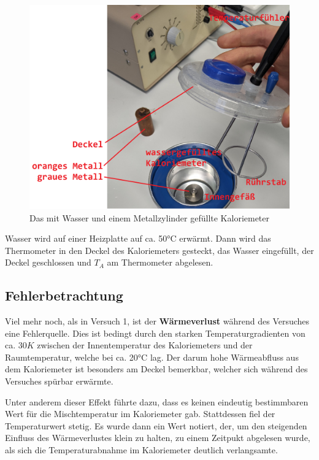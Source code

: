 \documentclass[class=article, crop=false]{standalone}
\begin{document}
\begin{figure}
\centering
\includegraphics[width=\textwidth,height=0.25\textheight]{Bilder/V2.png}
\caption{Das mit Wasser und einem Metallzylinder gefüllte Kaloriemeter}
\end{figure}

Wasser wird auf einer Heizplatte auf ca. 50°C erwärmt. Dann wird das
Thermometer in den Deckel des Kaloriemeters gesteckt, das Wasser
eingefüllt, der Deckel geschlossen und \(T_A\) am Thermometer abgelesen.

\hypertarget{fehlerbetrachtung-1}{%
\subsection{Fehlerbetrachtung}\label{fehlerbetrachtung-1}}

Viel mehr noch, als in Versuch 1, ist der \textbf{Wärmeverlust} während
des Versuches eine Fehlerquelle. Dies ist bedingt durch den starken
Temperaturgradienten von ca. \(30K\) zwischen der Innentemperatur des
Kaloriemeters und der Raumtemperatur, welche bei ca. 20°C lag. Der darum
hohe Wärmeabfluss aus dem Kaloriemeter ist besonders am Deckel
bemerkbar, welcher sich während des Versuches spürbar erwärmte.

Unter anderem dieser Effekt führte dazu, dass es keinen eindeutig
bestimmbaren Wert für die Mischtemperatur im Kaloriemeter gab.
Stattdessen fiel der Temperaturwert stetig. Es wurde dann ein Wert
notiert, der, um den steigenden Einfluss des Wärmeverlustes klein zu
halten, zu einem Zeitpukt abgelesen wurde, als sich die
Temperaturabnahme im Kaloriemeter deutlich verlangsamte.
\end{document}
